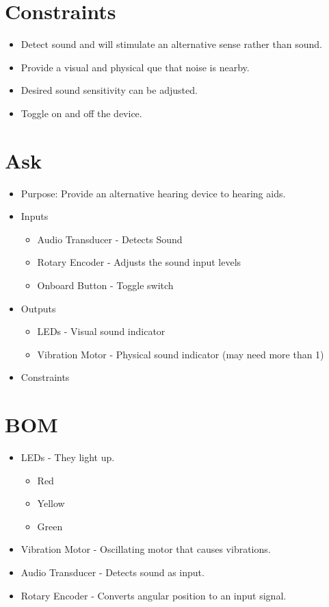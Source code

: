 \documentclass{article}
\begin{document}
\section{Constraints}
\begin{itemize}
    \item Detect sound and will stimulate an alternative sense rather than sound.
    \item Provide a visual and physical que that noise is nearby.
    \item Desired sound sensitivity can be adjusted.
    \item Toggle on and off the device.
  \end{itemize}

\section{Ask}
\begin{itemize}
    \item Purpose:
    \newline
    Provide an alternative hearing device to hearing aids.
    \item Inputs
    \begin{itemize}
        \item Audio Transducer  - Detects Sound
        \item Rotary Encoder - Adjusts the sound input levels
        \item Onboard Button - Toggle switch
    \end{itemize}

    \item Outputs
    \begin{itemize}
        \item LEDs - Visual sound indicator
        \item Vibration Motor - Physical sound indicator (may need more than 1)
    \end{itemize}
    \item Constraints
  \end{itemize}

\section{BOM}
\begin{itemize}
    \item LEDs - They light up.
    \begin{itemize}
        \item Red
        \item Yellow
        \item Green
    \end{itemize}
    \item Vibration Motor - Oscillating motor that causes vibrations.
    \item Audio Transducer - Detects sound as input.
    \item Rotary Encoder - Converts angular position to an input signal.
  \end{itemize}
\end{document}
